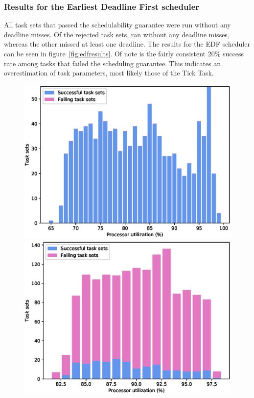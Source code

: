 \newpage
\subsubsection{Results for the Earliest Deadline First scheduler}
All \totalsuccess{} task sets that passed the schedulability guarantee were run without any deadline misses. Of the \totalfailure{} rejected task sets, \edffailurepassed{} ran without any deadline misses, whereas the other \edffailurefailed{} missed at least one deadline. The results for the EDF scheduler can be seen in figure~\ref{fig:edfresults}. Of note is the fairly consistent 20\% success rate among tasks that failed the scheduling guarantee. This indicates an overestimation of task parameters, most likely those of the \ucos Tick Task.

\begin{figure}[htpb]
    \centering
    \hspace*{-1.6cm}
    \begin{minipage}{0.62\textwidth}
        \includegraphics[width=\textwidth]{figures/edf_guarantee_pass_percentage.eps}
    \end{minipage}%
    \begin{minipage}{0.62\textwidth}
        \includegraphics[width=\textwidth]{figures/edf_guarantee_fail_percentage.eps}

\end{minipage}
\end{figure}

